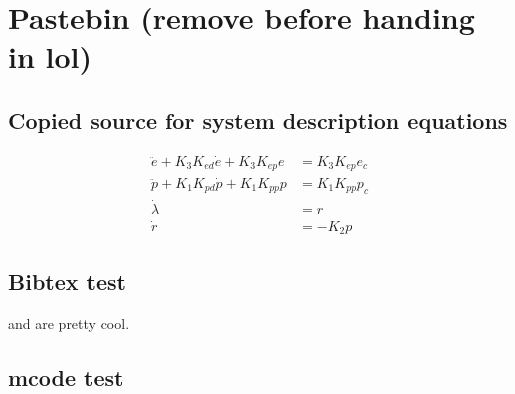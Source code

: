 \section{Pastebin (remove before handing in lol)}

\subsection{Copied source for system description equations}
\begin{subequations}
\label{eq:model_al}
\begin{align}
	\ddot{e} + K_{3} K_{ed} \dot{e} + K_{3} K_{ep} e &= K_{3} K_{ep} e_{c} \label{eq:model_se_al_elev} \\
	\ddot{p} + K_{1} K_{pd} \dot{p} + K_{1} K_{pp} p &= K_{1} K_{pp} p_{c} \label{eq:model_se_al_pitch} \\
	\dot{\lambda} &= r \label{eq:model_se_al_lambda} \\
	\dot{r} &= -K_{2} p \label{eq:model_se_al_r} 
\end{align}
\end{subequations}

\subsection{Bibtex test}
\cite{nocedal_numerical_2006} and \cite{_helicopter_2015} are pretty cool.

\subsection{mcode test}


